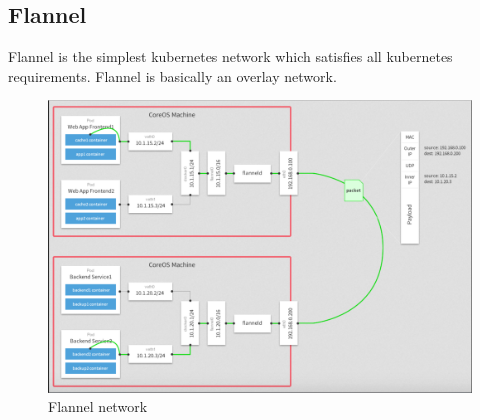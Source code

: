 \documentclass[12pt]{report}
\begin{document}
\subsection{Flannel}
Flannel is the simplest kubernetes network  which satisfies all kubernetes requirements. Flannel is basically an overlay network.
\begin{figure}[h!]
	\begin{center}
		\includegraphics[totalheight=0.4\textheight, width=\textwidth]{flannel}
		\caption{Flannel network \cite{Flannel}}
	\end{center}
\end{figure}
\end{document}
